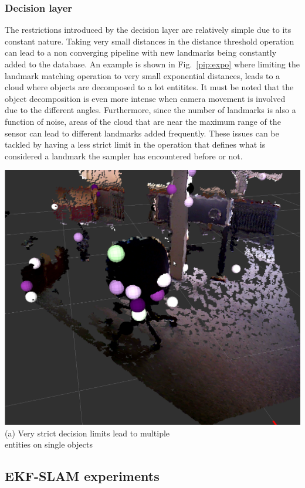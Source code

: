 \documentclass[twoside,hidelinks]{article}
\begin{document}
\subsubsection{Decision layer}

The restrictions introduced by the decision layer are relatively simple due to its constant nature. Taking very small distances in the distance threshold operation can lead to a non converging pipeline with new landmarks being constantly added to the database. An example is shown in Fig.~\ref{pip:expo} where limiting the landmark matching operation to very small exponential distances, leads to a cloud where objects are decomposed to a lot entitites. It must be noted that the object decomposition is even more intense when camera movement is involved due to the different angles. Furthermore, since the number of landmarks is also a function of noise, areas of the cloud that are near the maximum range of the sensor can lead to different landmarks added frequently. These issues can be tackled by having a less strict limit in the operation that defines what is considered a landmark the sampler has encountered before or not.

\begin{center}

	    \includegraphics[width=.5\textwidth]{monsterchair} \\
	  (a) Very strict decision limits lead to multiple \\
	   entities on single objects \\[6pt]
	
	  \label{pip:expo}

\end{center}


\subsection{EKF-SLAM experiments}
\end{document}
